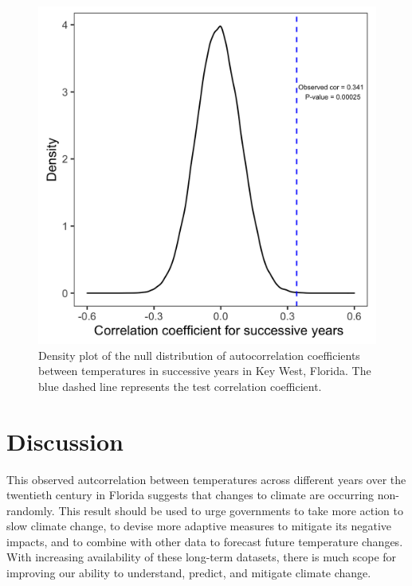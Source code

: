 \documentclass{article}
\begin{document}
\begin{figure}[htbp]
\begin{minipage}{.5\textwidth}
        \includegraphics[scale=0.2]{PermuCorCoeff_TAutoCorr.png}
        \caption{Density plot of the null distribution of autocorrelation coefficients between temperatures in successive years in Key West, Florida. The blue dashed line represents the test correlation coefficient.}
        \label{fig:test2}
    \end{minipage}
    \end{figure}\vspace{-1.5em}

\section{Discussion \vspace{-0.5em}}

    This observed autcorrelation between temperatures across different years over the twentieth century in Florida suggests that changes to climate are occurring non-randomly. This result should be used to urge governments to take more action to slow climate change, to devise more adaptive measures to mitigate its negative impacts, and to combine with other data to forecast future temperature changes. With increasing availability of these long-term datasets, there is much scope for improving our ability to understand, predict, and mitigate climate change. \vspace{-1em}
    


	
	
\end{document}
